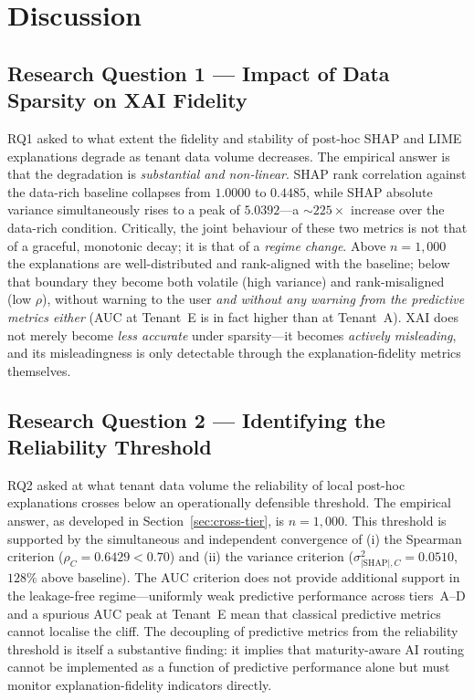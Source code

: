 \section{Discussion}
\label{sec:discussion}

\subsection{Research Question 1 --- Impact of Data Sparsity on XAI Fidelity}
\label{subsec:rq1}

RQ1 asked to what extent the fidelity and stability of post-hoc SHAP and
LIME explanations degrade as tenant data volume decreases. The empirical
answer is that the degradation is \emph{substantial and non-linear}. SHAP
rank correlation against the data-rich baseline collapses from $1.0000$ to
$0.4485$, while SHAP absolute variance simultaneously rises to a peak of
$5.0392$---a $\sim\!225\times$ increase over the data-rich condition.
Critically, the joint behaviour of these two metrics is not that of a
graceful, monotonic decay; it is that of a \emph{regime change}. Above
$n = 1{,}000$ the explanations are well-distributed and rank-aligned with
the baseline; below that boundary they become both volatile (high
variance) and rank-misaligned (low $\rho$), without warning to the user
\emph{and without any warning from the predictive metrics either} (AUC at
Tenant~E is in fact higher than at Tenant~A). XAI does not merely become
\emph{less accurate} under sparsity---it becomes \emph{actively
misleading}, and its misleadingness is only detectable through the
explanation-fidelity metrics themselves.

\subsection{Research Question 2 --- Identifying the Reliability Threshold}
\label{subsec:rq2}

RQ2 asked at what tenant data volume the reliability of local post-hoc
explanations crosses below an operationally defensible threshold. The
empirical answer, as developed in Section~\ref{sec:cross-tier}, is
$n = 1{,}000$. This threshold is supported by the simultaneous and
independent convergence of (i) the Spearman criterion
($\rho_C = 0.6429 < 0.70$) and (ii) the variance criterion
($\sigma^2_{|\mathrm{SHAP}|,C} = 0.0510$, $128\%$ above baseline). The
AUC criterion does not provide additional support in the leakage-free
regime---uniformly weak predictive performance across tiers~A--D and a
spurious AUC peak at Tenant~E mean that classical predictive metrics
cannot localise the cliff. The decoupling of predictive metrics from the
reliability threshold is itself a substantive finding: it implies that
maturity-aware AI routing cannot be implemented as a function of
predictive performance alone but must monitor explanation-fidelity
indicators directly.

